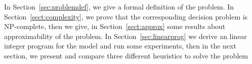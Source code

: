 In Section~\ref{sec:problemdef}, we give a formal definition of the problem. In Section~\ref{sect:complexity}, we prove that the corresponding decision problem is NP-complete, then we give, in Section~\ref{sect:approx} some results about approximability of the problem. In Section~\ref{sec:linearprog} we derive an linear integer program for the model and run some experiments, then in the next section, we present and compare three different heuristics to solve the problem
\vspace{-0.5cm}